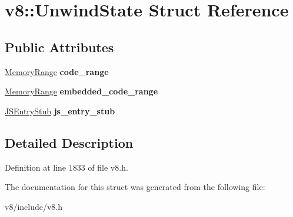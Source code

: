 \hypertarget{structv8_1_1UnwindState}{}\section{v8\+:\+:Unwind\+State Struct Reference}
\label{structv8_1_1UnwindState}
\subsection*{Public Attributes}
\begin{DoxyCompactItemize}
\item 
\mbox{\label{structv8_1_1UnwindState_a6928337ceb50f5ca7ac6ea9c2b5e79c9}} 
\mbox{\hyperlink{structv8_1_1MemoryRange}{Memory\+Range}} {\bfseries code\+\_\+range}
\item 
\mbox{\label{structv8_1_1UnwindState_af491a7ed0095d588e65346d2d47aeb10}} 
\mbox{\hyperlink{structv8_1_1MemoryRange}{Memory\+Range}} {\bfseries embedded\+\_\+code\+\_\+range}
\item 
\mbox{\label{structv8_1_1UnwindState_a6524b94b4e4530111fe284ba773aad35}} 
\mbox{\hyperlink{structv8_1_1JSEntryStub}{J\+S\+Entry\+Stub}} {\bfseries js\+\_\+entry\+\_\+stub}
\end{DoxyCompactItemize}


\subsection{Detailed Description}


Definition at line 1833 of file v8.\+h.



The documentation for this struct was generated from the following file\+:\begin{DoxyCompactItemize}
\item 
v8/include/v8.\+h\end{DoxyCompactItemize}

